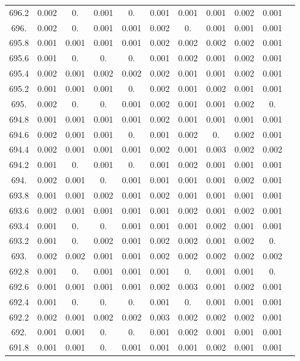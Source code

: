 \documentclass[12pt]{ctexart}
\numberwithin{equation}{section}
\begin{document}
\begin{longtable}{ccccccccccc}
696.2	&	0.002	&	0.	&	0.001	&	0.	&	0.001	&	0.001	&	0.001	&	0.002	&	0.001	\\
696.	&	0.002	&	0.	&	0.001	&	0.001	&	0.002	&	0.	&	0.001	&	0.001	&	0.001	\\
695.8	&	0.001	&	0.001	&	0.001	&	0.001	&	0.002	&	0.002	&	0.002	&	0.002	&	0.001	\\
695.6	&	0.001	&	0.	&	0.	&	0.	&	0.001	&	0.002	&	0.001	&	0.002	&	0.001	\\
695.4	&	0.002	&	0.001	&	0.002	&	0.002	&	0.002	&	0.001	&	0.001	&	0.002	&	0.001	\\
695.2	&	0.001	&	0.001	&	0.001	&	0.	&	0.002	&	0.001	&	0.002	&	0.001	&	0.001	\\
695.	&	0.002	&	0.	&	0.	&	0.001	&	0.002	&	0.001	&	0.001	&	0.002	&	0.	\\
694.8	&	0.001	&	0.001	&	0.001	&	0.001	&	0.002	&	0.001	&	0.001	&	0.001	&	0.001	\\
694.6	&	0.002	&	0.001	&	0.001	&	0.	&	0.001	&	0.002	&	0.	&	0.002	&	0.001	\\
694.4	&	0.002	&	0.001	&	0.001	&	0.001	&	0.002	&	0.001	&	0.003	&	0.002	&	0.002	\\
694.2	&	0.001	&	0.	&	0.001	&	0.	&	0.001	&	0.002	&	0.001	&	0.001	&	0.001	\\
694.	&	0.002	&	0.001	&	0.	&	0.001	&	0.001	&	0.001	&	0.001	&	0.002	&	0.001	\\
693.8	&	0.001	&	0.001	&	0.002	&	0.001	&	0.002	&	0.001	&	0.001	&	0.001	&	0.001	\\
693.6	&	0.002	&	0.001	&	0.001	&	0.001	&	0.001	&	0.002	&	0.001	&	0.002	&	0.001	\\
693.4	&	0.001	&	0.	&	0.	&	0.001	&	0.001	&	0.001	&	0.002	&	0.001	&	0.001	\\
693.2	&	0.001	&	0.	&	0.002	&	0.001	&	0.002	&	0.002	&	0.001	&	0.002	&	0.	\\
693.	&	0.002	&	0.002	&	0.001	&	0.001	&	0.002	&	0.002	&	0.002	&	0.002	&	0.002	\\
692.8	&	0.001	&	0.	&	0.001	&	0.001	&	0.001	&	0.	&	0.001	&	0.001	&	0.	\\
692.6	&	0.001	&	0.001	&	0.001	&	0.001	&	0.002	&	0.003	&	0.001	&	0.002	&	0.001	\\
692.4	&	0.001	&	0.	&	0.	&	0.	&	0.001	&	0.	&	0.001	&	0.001	&	0.001	\\
692.2	&	0.002	&	0.001	&	0.002	&	0.002	&	0.003	&	0.002	&	0.002	&	0.002	&	0.001	\\
692.	&	0.001	&	0.001	&	0.	&	0.	&	0.001	&	0.002	&	0.001	&	0.001	&	0.001	\\
691.8	&	0.001	&	0.001	&	0.	&	0.001	&	0.001	&	0.001	&	0.002	&	0.001	&	0.001	\\

\end{longtable}
\end{document}
